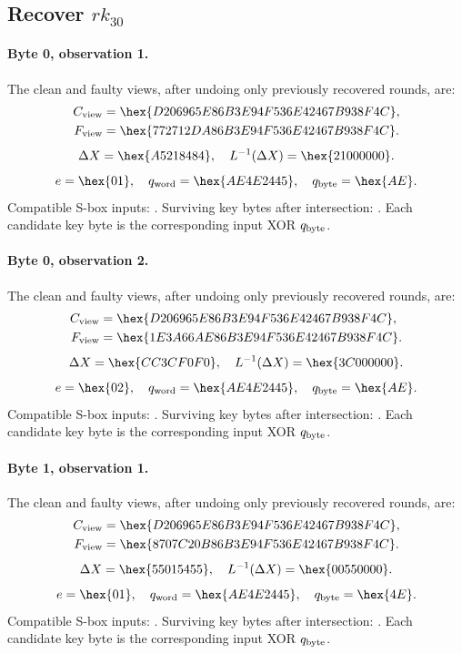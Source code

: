 \subsection*{Recover $rk_{30}$}
\paragraph{Byte 0, observation 1.}
The clean and faulty views, after undoing only previously recovered rounds, are:
\[\begin{aligned}C_{\rm view}&=\hex{D206965E86B3E94F536E42467B938F4C},\\F_{\rm view}&=\hex{772712DA86B3E94F536E42467B938F4C}.\end{aligned}\]
\[\Delta X=\hex{A5218484},\quad L^{-1}(\Delta X)=\hex{21000000}.\]
\[e=\hex{01},\quad q_{\rm word}=\hex{AE4E2445},\quad q_{\rm byte}=\hex{AE}.\]
Compatible S-box inputs: . Surviving key bytes after intersection: . Each candidate key byte is the corresponding input XOR $q_{\rm byte}$.
\paragraph{Byte 0, observation 2.}
The clean and faulty views, after undoing only previously recovered rounds, are:
\[\begin{aligned}C_{\rm view}&=\hex{D206965E86B3E94F536E42467B938F4C},\\F_{\rm view}&=\hex{1E3A66AE86B3E94F536E42467B938F4C}.\end{aligned}\]
\[\Delta X=\hex{CC3CF0F0},\quad L^{-1}(\Delta X)=\hex{3C000000}.\]
\[e=\hex{02},\quad q_{\rm word}=\hex{AE4E2445},\quad q_{\rm byte}=\hex{AE}.\]
Compatible S-box inputs: . Surviving key bytes after intersection: . Each candidate key byte is the corresponding input XOR $q_{\rm byte}$.
\paragraph{Byte 1, observation 1.}
The clean and faulty views, after undoing only previously recovered rounds, are:
\[\begin{aligned}C_{\rm view}&=\hex{D206965E86B3E94F536E42467B938F4C},\\F_{\rm view}&=\hex{8707C20B86B3E94F536E42467B938F4C}.\end{aligned}\]
\[\Delta X=\hex{55015455},\quad L^{-1}(\Delta X)=\hex{00550000}.\]
\[e=\hex{01},\quad q_{\rm word}=\hex{AE4E2445},\quad q_{\rm byte}=\hex{4E}.\]
Compatible S-box inputs: . Surviving key bytes after intersection: . Each candidate key byte is the corresponding input XOR $q_{\rm byte}$.
